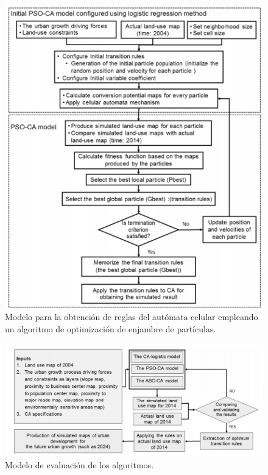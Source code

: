 \begin{figure}[H]
	\centering
	\includegraphics[width=\linewidth]{fig/pso}
	\caption{Modelo para la obtención de reglas del autómata celular empleando un algoritmo de optimización de enjambre de partículas.}
	\label{fig:pso}
\end{figure}

\begin{figure}[H]
	\centering
	\includegraphics[width=\linewidth]{fig/evaluation}
	\caption{Modelo de evaluación de los algoritmos.}
	\label{fig:evaluation}
\end{figure}

